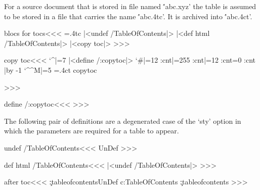 {{

For a source document that is stored in file named \''abc.xyz' the
table is assumed to be stored in a file that carries the name
\''abc.4tc'.  It is archived into \''abc.4ct'.

\<blocs for tocs\><<<
=\jobname.4tc
  
   \def\:TableOfContents[#1]{\writesixteen{No file \jobname.4tc}}
   |<undef /TableOfContents|>
\else  
   \ifHtml  |<def html /TableOfContents|>
   \fi
   |<copy toc|>  
\fi
>>>


\<copy toc\><<<
\begingroup
  \catcode`^|=7  
  |<define /:copytoc|>   \ifHtml \catcode`\#|=12\relax \fi
  \def\:next{\catcode\tmp:cnt|=12
    \ifnum \tmp:cnt=0
       \def\:next{%
          \catcode`\^^M|=5
          \immediate\openout15=\jobname.4ct     \:copytoc
          \immediate\closeout15
          \endgroup \closein15
       }%
    \fi
    \advance\tmp:cnt |by -1 \:next
  }
  \tmp:cnt|=255   \:next 
>>>


\<define /:copytoc\><<<
\def\:copytoc{%
   \ifeof15   \else
      \read15 to \:temp
      {\escapechar=`\\\immediate\write15{\:temp}}%
      \expandafter\:copytoc
   \fi}
>>>







The following pair of definitions are a degenerated case of the `sty' option
in which the parameters are required for a table to appear.

\<undef /TableOfContents\><<<
\ifx \TableOfContents\:UnDef
   \def\TableOfContents{\futurelet\:temp\:TOC}
   \def\:TOC{\ifx [\:temp \expandafter\:TableOfContents\fi}
\fi
>>>



\<def html /TableOfContents\><<<
|<undef /TableOfContents|>
\def\:TableOfContents[#1]{\SaveEverypar{%
   \def\TocCount{0}%
   |<interpretation for entries|>%
   \def\InsertTitle##1##2##3{}%
   \hsize|=4.5in  \rightskip |= \z@ minus 1in  \linepenalty|=1000
   \catcode`\#|=12  \catcode`\@|=11   \catcode`\:|=11  
   |<Configure HtmlPar for TOC|>\everypar{\HtmlPar}%
   |<before toc|> \jobname.4ct
   {\ht:everypar{}\leavevmode}|<bottom toc|>%
   \par  }\RecallEverypar |<after toc|>} 
>>>

\<after toc\><<<
\ifx \c:tableofcontents\:UnDef 
   \csname c:TableOfContents\endcsname
\else \c:tableofcontents \fi
>>>

}}
